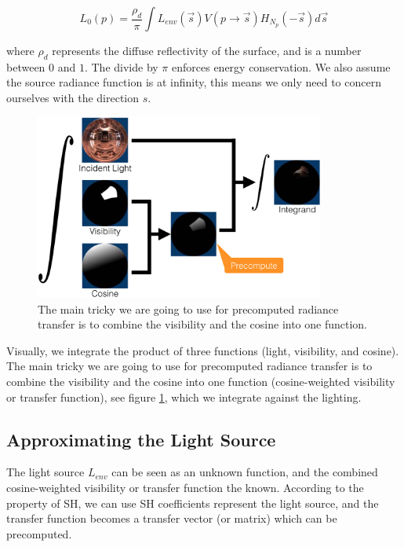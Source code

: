 \begin{equation*}
	L_0(p)=\frac{\rho_d}{\pi}\int L_{env}(\vec{s})V(p\to\vec{s})H_{N_p}(-\vec{s})d\vec{s}
\end{equation*} 

where $\rho_d$ represents the diffuse reflectivity of the surface, and is a number between $0$ and $1$. The divide by $\pi$ enforces energy conservation. We also assume the source radiance function is at infinity, this means we only need to concern ourselves with the direction $s$.

\begin{figure}\label{f:prt-1}
	\begin{center}
		\includegraphics[width=0.85\textwidth]{graphics/prt/prt-7}
	\end{center}
	\caption{The main tricky we are going to use for precomputed radiance transfer is to combine the visibility and the cosine into one function.}
\end{figure}

Visually, we integrate the product of three functions (light, visibility, and cosine). The main tricky we are going to use for precomputed radiance transfer is to combine the visibility and the cosine into one function (cosine-weighted visibility or transfer function), see figure \ref{f:prt-1}, which we integrate against the lighting.



\subsection{Approximating the Light Source}
The light source $L_{env}$ can be seen as an unknown function, and the combined cosine-weighted visibility or transfer function the known. According to the property of SH, we can use SH coefficients represent the light source, and the transfer function becomes a transfer vector (or matrix) which can be precomputed. 
 
